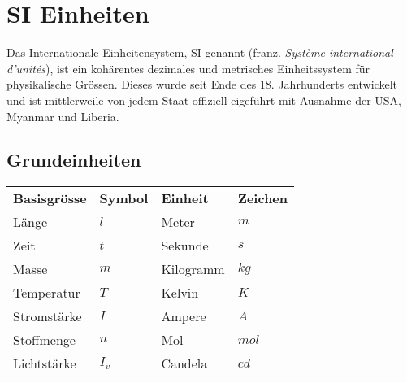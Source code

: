 



\chapter{SI Einheiten}

Das Internationale Einheitensystem, SI genannt 
(franz. \textit{Système international d'unités}),
ist ein kohärentes dezimales und metrisches Einheitssystem für 
physikalische Grössen. Dieses wurde seit Ende des 18. Jahrhunderts
entwickelt und ist mittlerweile von jedem Staat offiziell eigeführt mit 
Ausnahme der USA, Myanmar und Liberia.

\newpage
\section{Grundeinheiten}
\begin{footnotesize}
\begin{tabular}{llll}
  \rowcolor{white} \textbf{Basisgrösse} & \textbf{Symbol} 
                    & \textbf{Einheit} & \textbf{Zeichen}\\
  \rowcolor{lgray} Länge       & $l$   & Meter     & $m$\\
  \rowcolor{white} Zeit        & $t$   & Sekunde   & $s$\\
  \rowcolor{lgray} Masse       & $m$   & Kilogramm & $kg$\\
  \rowcolor{white} Temperatur  & $T$   & Kelvin    & $K$\\
  \rowcolor{lgray} Stromstärke & $I$   & Ampere    & $A$\\
  \rowcolor{white} Stoffmenge  & $n$   & Mol       & $mol$\\
  \rowcolor{lgray} Lichtstärke & $I_v$ & Candela   & $cd$\\
\end{tabular}
\end{footnotesize}

